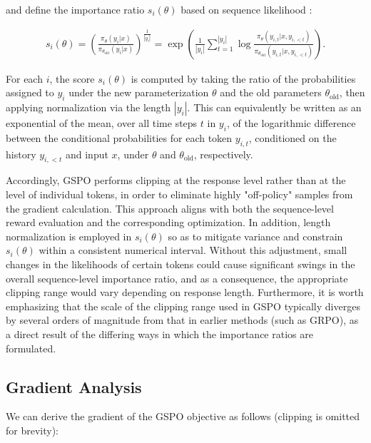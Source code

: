 and define the importance ratio $s_{i}(\theta)$ based on sequence likelihood \citep{click}:

\begin{align}
s_{i}(\theta) = \left( \frac{ \pi_{\theta} (y_i | x) }{ \pi_{\theta_\text{old}} (y_i | x)} \right)^{\frac{1}{|y_i|}}
=
\exp \left( \frac{1}{|y_i|} \sum_{t=1}^{|y_i|} \log \frac{ \pi_{\theta} (y_{i,t} | x, y_{i,<t}) }{ \pi_{\theta_\text{old}} (y_{i,t} | x,y_{i,<t})} \right).
\end{align}

For each $i$, the score $s_{i}(\theta)$ is computed by taking the ratio of the probabilities assigned to $y_i$ under the new parameterization $\theta$ and the old parameters $\theta_\text{old}$, then applying normalization via the length $|y_i|$. This can equivalently be written as an exponential of the mean, over all time steps $t$ in $y_i$, of the logarithmic difference between the conditional probabilities for each token $y_{i,t}$, conditioned on the history $y_{i,<t}$ and input $x$, under $\theta$ and $\theta_\text{old}$, respectively.

Accordingly, GSPO performs clipping at the response level rather than at the level of individual tokens, in order to eliminate highly "off-policy" samples from the gradient calculation. This approach aligns with both the sequence-level reward evaluation and the corresponding optimization. In addition, length normalization is employed in $s_{i}(\theta)$ so as to mitigate variance and constrain $s_{i}(\theta)$ within a consistent numerical interval. Without this adjustment, small changes in the likelihoods of certain tokens could cause significant swings in the overall sequence-level importance ratio, and as a consequence, the appropriate clipping range would vary depending on response length. Furthermore, it is worth emphasizing that the scale of the clipping range used in GSPO typically diverges by several orders of magnitude from that in earlier methods (such as GRPO), as a direct result of the differing ways in which the importance ratios are formulated.

\subsection{Gradient Analysis}
\label{subsec:gradient}

We can derive the gradient of the GSPO objective as follows (clipping is omitted for brevity):

